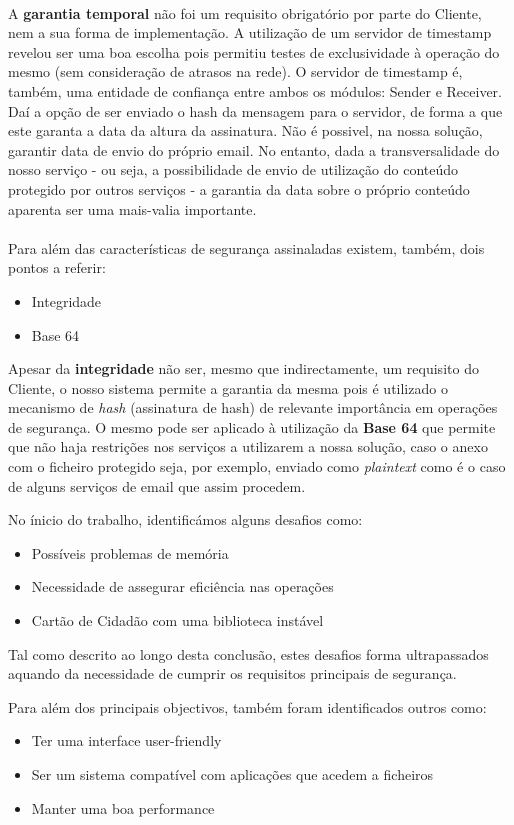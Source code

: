 \\
A \textbf{garantia temporal} não foi um requisito obrigatório por parte do Cliente, nem a sua forma de implementação. A utilização de um servidor de timestamp revelou ser uma boa escolha pois permitiu testes de exclusividade à operação do mesmo (sem consideração de atrasos na rede).
O servidor de timestamp é, também, uma entidade de confiança entre ambos os módulos: Sender e Receiver. Daí a opção de ser enviado o hash da mensagem para o servidor, de forma a que este garanta a data da altura da assinatura.
Não é possivel, na nossa solução, garantir data de envio do próprio email. No entanto, dada a transversalidade do nosso serviço - ou seja, a possibilidade de envio de utilização do conteúdo protegido por outros serviços - a garantia da data sobre o próprio conteúdo aparenta ser uma mais-valia importante. \\
\\
Para além das características de segurança assinaladas existem, também, dois pontos a referir:
\begin{itemize}
\item Integridade
\item Base 64
\end{itemize}

Apesar da \textbf{integridade} não ser, mesmo que indirectamente, um requisito do Cliente, o nosso sistema permite a garantia da mesma pois é utilizado o mecanismo de \textit{hash} (assinatura de hash) de relevante importância em operações de segurança.
O mesmo pode ser aplicado à utilização da \textbf{Base 64} que permite que não haja restrições nos serviços a utilizarem a nossa solução, caso o anexo com o ficheiro protegido seja, por exemplo, enviado como \textit{plaintext} como é o caso de alguns serviços de email que assim procedem.

No ínicio do trabalho, identificámos alguns desafios como:
\begin{itemize}
\item Possíveis problemas de memória
\item Necessidade de assegurar eficiência nas operações
\item Cartão de Cidadão com uma biblioteca instável
\end{itemize}
Tal como descrito ao longo desta conclusão, estes desafios forma ultrapassados aquando da necessidade de cumprir os requisitos principais de segurança.

Para além dos principais objectivos, também foram identificados outros como:
\begin{itemize}
\item Ter uma interface user-friendly
\item Ser um sistema compatível com aplicações que acedem a ficheiros
\item Manter uma boa performance
\end{itemize}


